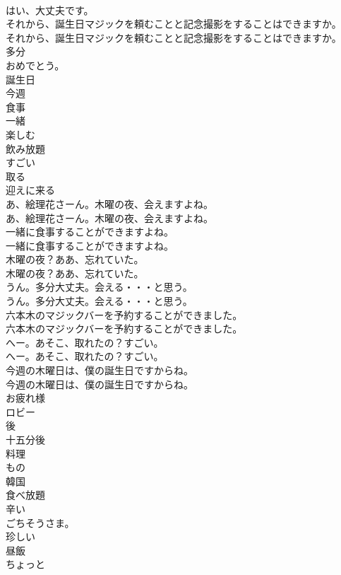 \documentclass[8pt]{extreport}
\begin{document}
\begin{CJK}{UTF8}{min}
\\	はい、大丈夫です。 
\\	それから、誕生日マジックを頼むことと記念撮影をすることはできますか。	
\\	それから、誕生日マジックを頼むことと記念撮影をすることはできますか。 
\\	多分
\\	おめでとう。
\\	誕生日
\\	今週
\\	食事
\\	一緒
\\	楽しむ
\\	飲み放題
\\	すごい
\\	取る
\\	迎えに来る
\\	あ、絵理花さーん。木曜の夜、会えますよね。	
\\	あ、絵理花さーん。木曜の夜、会えますよね。 
\\	一緒に食事することができますよね。	
\\	一緒に食事することができますよね。 
\\	木曜の夜？ああ、忘れていた。	
\\	木曜の夜？ああ、忘れていた。 
\\	うん。多分大丈夫。会える・・・と思う。	
\\	うん。多分大丈夫。会える・・・と思う。 
\\	六本木のマジックバーを予約することができました。	
\\	六本木のマジックバーを予約することができました。 
\\	へー。あそこ、取れたの？すごい。	
\\	へー。あそこ、取れたの？すごい。 
\\	今週の木曜日は、僕の誕生日ですからね。	
\\	今週の木曜日は、僕の誕生日ですからね。 
\\	お疲れ様
\\	ロビー
\\	後
\\	十五分後
\\	料理
\\	もの
\\	韓国
\\	食べ放題
\\	辛い
\\	ごちそうさま。
\\	珍しい
\\	昼飯
\\	ちょっと

\end{CJK}
\end{document}
